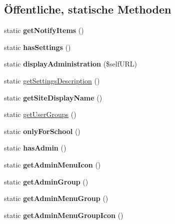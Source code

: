\subsection*{Öffentliche, statische Methoden}
\begin{DoxyCompactItemize}
\item 
\mbox{\label{classlaufzettel_a1df850e42d74ef5d33723a75e339376d}} 
static {\bfseries get\+Notify\+Items} ()
\item 
\mbox{\label{classlaufzettel_ab440b9f23fd044eb0d59ad0d8baa782e}} 
static {\bfseries has\+Settings} ()
\item 
\mbox{\label{classlaufzettel_ae7c7c26b379d2eb53d4bd22e261df243}} 
static {\bfseries display\+Administration} (\$self\+U\+RL)
\item 
static \mbox{\hyperlink{classlaufzettel_a15851011f57669b75b6577904652976f}{get\+Settings\+Description}} ()
\item 
\mbox{\label{classlaufzettel_a194e4a443ade2823b12d6eae03a02a2e}} 
static {\bfseries get\+Site\+Display\+Name} ()
\item 
static \mbox{\hyperlink{classlaufzettel_afc3548e92fa7c720ac610f3e621436f7}{get\+User\+Groups}} ()
\item 
\mbox{\label{classlaufzettel_ab91ea1214428ca02f49d90c6165578b4}} 
static {\bfseries only\+For\+School} ()
\item 
\mbox{\label{classlaufzettel_a74372da87ae38b439eea8b7408f1f3d0}} 
static {\bfseries has\+Admin} ()
\item 
\mbox{\label{classlaufzettel_a48dd0db411e40b8e2d95f45110a5742f}} 
static {\bfseries get\+Admin\+Menu\+Icon} ()
\item 
\mbox{\label{classlaufzettel_af95851d2858de92aea0fa8bf48c078c8}} 
static {\bfseries get\+Admin\+Group} ()
\item 
\mbox{\label{classlaufzettel_a79a46e0f6346f0c84f4d3e8c2bbe82f4}} 
static {\bfseries get\+Admin\+Menu\+Group} ()
\item 
\mbox{\label{classlaufzettel_a96a25b39465d25b8bb47a59dc586bd34}} 
static {\bfseries get\+Admin\+Menu\+Group\+Icon} ()
\end{DoxyCompactItemize}
